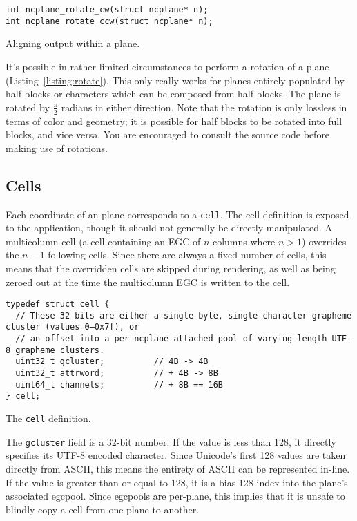 \begin{listing}[!htb]
\begin{verbatim}
int ncplane_rotate_cw(struct ncplane* n);
int ncplane_rotate_ccw(struct ncplane* n);
\end{verbatim}
\caption{Aligning output within a plane.}
\label{listing:rotate}
\end{listing}
It's possible in rather limited circumstances to perform a rotation of a plane
(Listing~\ref{listing:rotate}). This only really works for planes entirely
populated by half blocks or characters which can be composed from half blocks.
The plane is rotated by $\frac{\pi}{2}$ radians in either direction. Note that
the rotation is only lossless in terms of color and geometry; it is possible
for half blocks to be rotated into full blocks, and vice versa. You are
encouraged to consult the source code before making use of rotations.

\subsection{Cells}
\label{sec:cells}
Each coordinate of an plane corresponds to a \texttt{cell}. The cell definition
is exposed to the application, though it should not generally be directly
manipulated. A multicolumn cell (a cell containing an EGC of $n$ columns where
$n>1$) overrides the $n-1$ following cells. Since there are always a fixed
number of cells, this means that the overridden cells are skipped during
rendering, as well as being zeroed out at the time the multicolumn EGC is
written to the cell.
\begin{listing}[!htb]
\begin{verbatim}
typedef struct cell {
  // These 32 bits are either a single-byte, single-character grapheme cluster (values 0–0x7f), or
  // an offset into a per-ncplane attached pool of varying-length UTF-8 grapheme clusters.
  uint32_t gcluster;          // 4B -> 4B
  uint32_t attrword;          // + 4B -> 8B
  uint64_t channels;          // + 8B == 16B
} cell;
\end{verbatim}
\caption{The \texttt{cell} definition.}
\end{listing}
The \texttt{gcluster} field is a 32-bit number. If the value is less than 128,
it directly specifies its UTF-8 encoded character. Since Unicode's first 128
values are taken directly from ASCII, this means the entirety of ASCII can be
represented in-line. If the value is greater than or equal to 128, it is a
bias-128 index into the plane's associated egcpool. Since egcpools are per-plane,
this implies that it is unsafe to blindly copy a cell from one plane to another.

